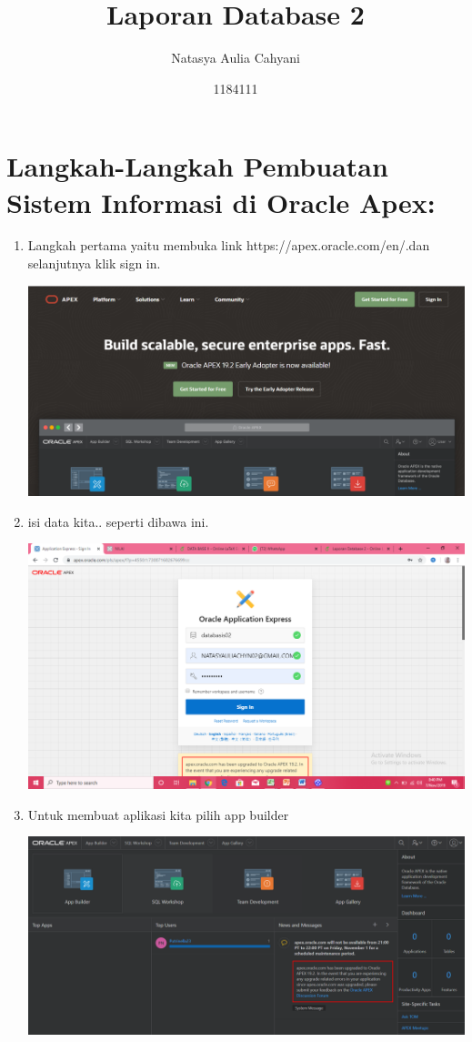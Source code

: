\documentclass{article}
\title{Laporan Database 2}
\author{Natasya Aulia Cahyani}
\date{1184111}
\begin{document}
\maketitle

\section{Langkah-Langkah Pembuatan Sistem Informasi di Oracle Apex:}
\begin{enumerate}
    \item Langkah pertama yaitu membuka link https://apex.oracle.com/en/.dan selanjutnya klik sign in.
  \begin{center}
    \includegraphics[width=.8\textwidth]{figure/1.PNG}
\end{center}
    \item isi data kita.. seperti dibawa ini.
    \begin{center}
    \includegraphics[width=.8\textwidth]{figure/29.png}
\end{center}
    \item Untuk membuat aplikasi kita pilih app builder
    \begin{center}
    \includegraphics[width=.8\textwidth]{figure/3.PNG}

\end{center}
\end{enumerate}
\end{document}
